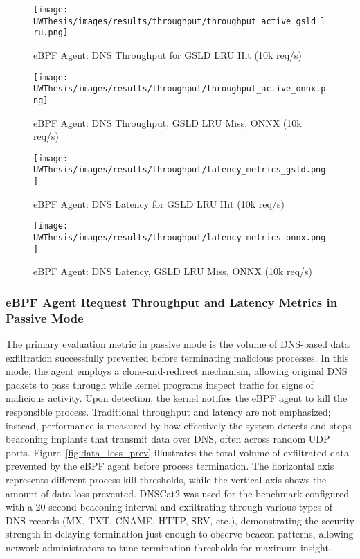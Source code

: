 \documentclass [11pt, proquest] {uwthesis}[2020/02/24]
\begin{document}
\begin{figure}[H]
  \centering
  \begin{minipage}[t]{0.47\textwidth}
    \centering
    \texttt{[image: UWThesis/images/results/throughput/throughput\_active\_gsld\_lru.png]}
    \caption{eBPF Agent: DNS Throughput for GSLD LRU Hit (10k req/s)}
    \label{fig:throughput_gsld}
  \end{minipage}
  \hfill
  \begin{minipage}[t]{0.47\textwidth}
    \centering
    \texttt{[image: UWThesis/images/results/throughput/throughput\_active\_onnx.png]}
    \caption{eBPF Agent: DNS Throughput, GSLD LRU Miss, ONNX (10k req/s)}
    \label{fig:throughput_onnx}
  \end{minipage}

  \vspace{1cm} %

  \begin{minipage}[t]{0.47\textwidth}
    \centering
    \texttt{[image: UWThesis/images/results/throughput/latency\_metrics\_gsld.png]}
    \caption{eBPF Agent: DNS Latency for GSLD LRU Hit (10k req/s)}
    \label{fig:latency_gsld}
  \end{minipage}
  \hfill
  \begin{minipage}[t]{0.47\textwidth}
    \centering
    \texttt{[image: UWThesis/images/results/throughput/latency\_metrics\_onnx.png]}
    \caption{eBPF Agent: DNS Latency, GSLD LRU Miss, ONNX (10k req/s)}
    \label{fig:latency_onnx}
  \end{minipage}
\end{figure}

\subsubsection{eBPF Agent Request Throughput and Latency Metrics in Passive Mode}
The primary evaluation metric in passive mode is the volume of DNS-based data exfiltration successfully prevented before terminating malicious processes. In this mode, the agent employs a clone-and-redirect mechanism, allowing original DNS packets to pass through while kernel programs inspect traffic for signs of malicious activity. Upon detection, the kernel notifies the eBPF agent to kill the responsible process. Traditional throughput and latency are not emphasized; instead, performance is measured by how effectively the system detects and stops beaconing implants that transmit data over DNS, often across random UDP ports. 
Figure~\ref{fig:data_loss_prev} illustrates the total volume of exfiltrated data prevented by the eBPF agent before process termination. The horizontal axis represents different process kill thresholds, while the vertical axis shows the amount of data loss prevented. DNSCat2 was used for the benchmark configured with a 20-second beaconing interval and exfiltrating through various types of DNS records (MX, TXT, CNAME, HTTP, SRV, etc.), demonstrating the security strength in delaying termination just enough to observe beacon patterns, allowing network administrators to tune termination thresholds for maximum insight.
\end{document}
